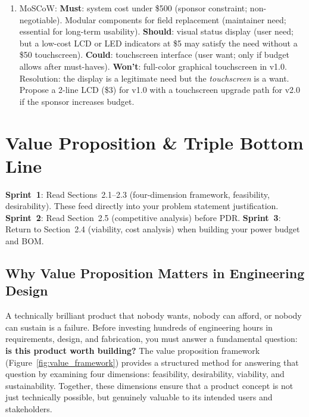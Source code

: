 \documentclass[11pt,letterpaper,twoside,openany]{book}
\begin{document}
\begin{enumerate}[leftmargin=1.5em]
\item MoSCoW: \textbf{Must}: system cost under \$500 (sponsor constraint; non-negotiable). Modular components for field replacement (maintainer need; essential for long-term usability). \textbf{Should}: visual status display (user need; but a low-cost LCD or LED indicators at \$5 may satisfy the need without a \$50 touchscreen). \textbf{Could}: touchscreen interface (user want; only if budget allows after must-haves). \textbf{Won't}: full-color graphical touchscreen in v1.0. Resolution: the display is a legitimate need but the \emph{touchscreen} is a want. Propose a 2-line LCD (\$3) for v1.0 with a touchscreen upgrade path for v2.0 if the sponsor increases budget.
\end{enumerate}

\chapter{Value Proposition \& Triple Bottom Line}\label{ch:value}

\begin{tipbox}
\textbf{Sprint~1}: Read Sections~2.1--2.3 (four-dimension framework, feasibility, desirability). These feed directly into your problem statement justification. \textbf{Sprint~2}: Read Section~2.5 (competitive analysis) before PDR. \textbf{Sprint~3}: Return to Section~2.4 (viability, cost analysis) when building your power budget and BOM.
\end{tipbox}

\section{Why Value Proposition Matters in Engineering Design}
A technically brilliant product that nobody wants, nobody can afford, or nobody can sustain is a failure. Before investing hundreds of engineering hours in requirements, design, and fabrication, you must answer a fundamental question: \textbf{is this product worth building?} The value proposition framework (Figure~\ref{fig:value_framework}) provides a structured method for answering that question by examining four dimensions: feasibility, desirability, viability, and sustainability. Together, these dimensions ensure that a product concept is not just technically possible, but genuinely valuable to its intended users and stakeholders.
\end{document}
